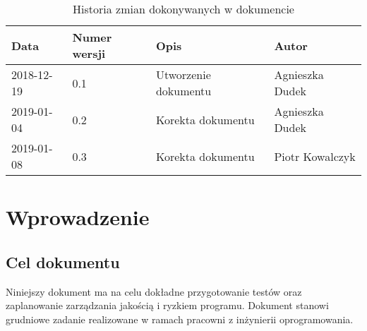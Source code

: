 \documentclass{article}
\begin{document}
\begin{titlepage}






\end{titlepage}

\addtocounter{page}{1}
\newpage

\begin{table}[h!]
	\begin{center}
		\caption{Historia zmian dokonywanych w dokumencie}
		\begin{tabular}{|l|l|l|l|}
			\hline
			Data & Numer wersji & Opis & Autor \\
			\hline \hline
			2018-12-19 & 0.1 & Utworzenie dokumentu & Agnieszka Dudek \\
			\hline
			2019-01-04 & 0.2 & Korekta dokumentu & Agnieszka Dudek \\
			\hline
			2019-01-08 & 0.3 & Korekta dokumentu & Piotr Kowalczyk \\
			\hline 
    \end{tabular}
	\end{center}
\end{table}	

\tableofcontents

\newpage


\section{Wprowadzenie}

\subsection{Cel dokumentu}
Niniejszy dokument ma na celu dokładne przygotowanie testów oraz zaplanowanie zarządzania jakością i ryzkiem programu.
Dokument stanowi grudniowe zadanie realizowane w ramach pracowni z inżynierii oprogramowania.
\end{document}
